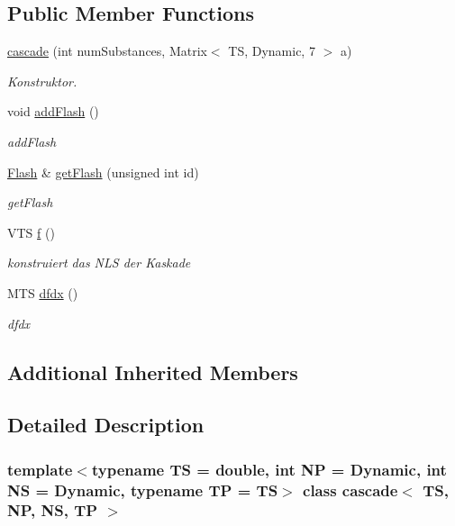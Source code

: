 \subsection*{Public Member Functions}
\begin{DoxyCompactItemize}
\item 
\mbox{\hyperlink{classcascade_a9775f4c242df052cfb9c0c8a095a2964}{cascade}} (int num\+Substances, Matrix$<$ TS, Dynamic, 7 $>$ a)
\begin{DoxyCompactList}\small\item\em Konstruktor. \end{DoxyCompactList}\item 
void \mbox{\hyperlink{classcascade_ae1aae44e18b9d87cb710c54726726baa}{add\+Flash}} ()
\begin{DoxyCompactList}\small\item\em add\+Flash \end{DoxyCompactList}\item 
\mbox{\hyperlink{class_flash}{Flash}} \& \mbox{\hyperlink{classcascade_a1608f0fc7e55bd87b4fc1a109ded71fa}{get\+Flash}} (unsigned int id)
\begin{DoxyCompactList}\small\item\em get\+Flash \end{DoxyCompactList}\item 
V\+TS \mbox{\hyperlink{classcascade_a9c5bb14ea8b17d1f79c097c6704f1919}{f}} ()
\begin{DoxyCompactList}\small\item\em konstruiert das N\+LS der Kaskade \end{DoxyCompactList}\item 
M\+TS \mbox{\hyperlink{classcascade_ac72705f0ad01cc88d43c002d63acce13}{dfdx}} ()
\begin{DoxyCompactList}\small\item\em dfdx \end{DoxyCompactList}\end{DoxyCompactItemize}
\subsection*{Additional Inherited Members}


\subsection{Detailed Description}
\subsubsection*{template$<$typename TS = double, int NP = Dynamic, int NS = Dynamic, typename TP = TS$>$\newline
class cascade$<$ T\+S, N\+P, N\+S, T\+P $>$}

